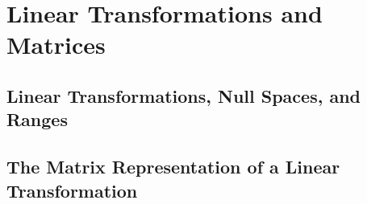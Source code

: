 \chapter{Linear Transformations and Matrices}
\thispagestyle{empty}
\newpage

\section{Linear Transformations, Null Spaces, and Ranges}



\vspace{12pt}

\setcounter{Exercise}{5}


\vspace{12pt}

\setcounter{Exercise}{10}


\vspace{12pt}



\vspace{12pt}

\setcounter{Exercise}{19}


\vspace{12pt}

\setcounter{Exercise}{21}


\vspace{12pt}

\setcounter{Exercise}{23}


\vspace{12pt}

\setcounter{Exercise}{34}



\section{The Matrix Representation of a Linear Transformation}



\vspace{12pt}



\vspace{12pt}

\setcounter{Exercise}{5}


